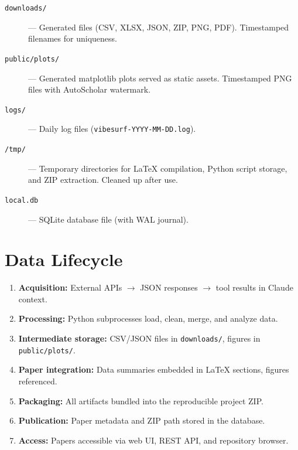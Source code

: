 \begin{description}
  \item[\texttt{downloads/}] --- Generated files (CSV, XLSX, JSON, ZIP, PNG, PDF). Timestamped filenames for uniqueness.
  \item[\texttt{public/plots/}] --- Generated matplotlib plots served as static assets. Timestamped PNG files with AutoScholar watermark.
  \item[\texttt{logs/}] --- Daily log files (\texttt{vibesurf-YYYY-MM-DD.log}).
  \item[\texttt{/tmp/}] --- Temporary directories for \LaTeX{} compilation, Python script storage, and ZIP extraction. Cleaned up after use.
  \item[\texttt{local.db}] --- SQLite database file (with WAL journal).
\end{description}

\section{Data Lifecycle}
\label{sec:data:lifecycle}

\begin{enumerate}
  \item \textbf{Acquisition:} External APIs $\to$ JSON responses $\to$ tool results in Claude context.
  \item \textbf{Processing:} Python subprocesses load, clean, merge, and analyze data.
  \item \textbf{Intermediate storage:} CSV/JSON files in \texttt{downloads/}, figures in \texttt{public/plots/}.
  \item \textbf{Paper integration:} Data summaries embedded in \LaTeX{} sections, figures referenced.
  \item \textbf{Packaging:} All artifacts bundled into the reproducible project ZIP.
  \item \textbf{Publication:} Paper metadata and ZIP path stored in the database.
  \item \textbf{Access:} Papers accessible via web UI, REST API, and repository browser.
\end{enumerate}

